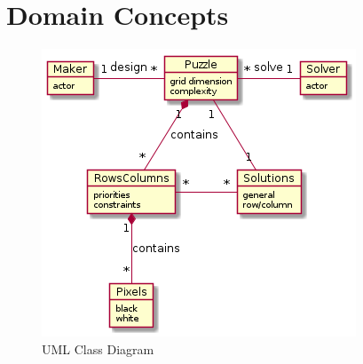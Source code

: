 \documentclass[12pt]{article}
\begin{document}
\section{Domain Concepts}

\begin{figure}[H]
\begin{center}
\includegraphics[scale=0.6]{classdiagram}
\caption{UML Class Diagram}
\label{fig:class-diagram}
\end{center}
\end{figure}
\end{document}

